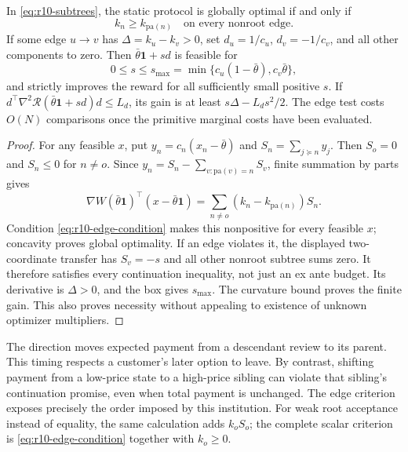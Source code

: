 \begin{theorem}\label{thm:r10-edge}
In \eqref{eq:r10-subtrees}, the static protocol is globally optimal if and only if
\begin{equation}\label{eq:r10-edge-condition}
 k_n\geq k_{\mathrm{pa}(n)}\quad\text{on every nonroot edge}.
\end{equation}
If some edge $u\to v$ has $\Delta=k_u-k_v>0$, set $d_u=1/c_u$, $d_v=-1/c_v$, and all other components to zero. Then $\bar\theta\mathbf1+sd$ is feasible for
\[
 0\leq s\leq s_{\max}=\min\{c_u(1-\bar\theta),c_v\bar\theta\},
\]
and strictly improves the reward for all sufficiently small positive $s$. If $d^\top\nabla^2\mathcal R(\bar\theta\mathbf1+sd)d\leq L_d$, its gain is at least $s\Delta-L_ds^2/2$. The edge test costs $O(N)$ comparisons once the primitive marginal costs have been evaluated.
\end{theorem}
\begin{proof}
For any feasible $x$, put $y_n=c_n(x_n-\bar\theta)$ and $S_n=\sum_{j\succeq n}y_j$. Then $S_o=0$ and $S_n\leq0$ for $n\ne o$. Since $y_n=S_n-\sum_{v:\mathrm{pa}(v)=n}S_v$, finite summation by parts gives
\begin{equation}\label{eq:r10-summation}
 \nabla W(\bar\theta\mathbf1)^\top(x-\bar\theta\mathbf1)
 =\sum_{n\ne o}(k_n-k_{\mathrm{pa}(n)})S_n.
\end{equation}
Condition \eqref{eq:r10-edge-condition} makes this nonpositive for every feasible $x$; concavity proves global optimality. If an edge violates it, the displayed two-coordinate transfer has $S_v=-s$ and all other nonroot subtree sums zero. It therefore satisfies every continuation inequality, not just an ex ante budget. Its derivative is $\Delta>0$, and the box gives $s_{\max}$. The curvature bound proves the finite gain. This also proves necessity without appealing to existence of unknown optimizer multipliers.
\end{proof}

The direction moves expected payment from a descendant review to its parent. This timing respects a customer's later option to leave. By contrast, shifting payment from a low-price state to a high-price sibling can violate that sibling's continuation promise, even when total payment is unchanged. The edge criterion exposes precisely the order imposed by this institution. For weak root acceptance instead of equality, the same calculation adds $k_oS_o$; the complete scalar criterion is \eqref{eq:r10-edge-condition} together with $k_o\geq0$.

